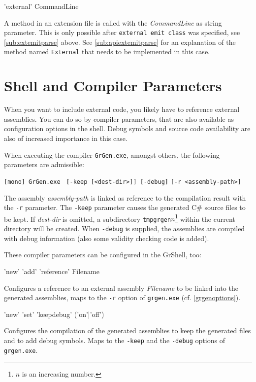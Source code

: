 \begin{rail}
  'external' CommandLine
\end{rail}
A method in an extension file is called with the \emph{CommandLine} as string parameter.
This is only possible after \texttt{external emit class} was specified, see \ref{sub:extemitparse} above.
See \ref{sub:apiextemitparse} for an explanation of the method named \texttt{External} that needs to be implemented in this case.

\pagebreak %

\section{Shell and Compiler Parameters}

When you want to include external code, you likely have to reference external assemblies.
You can do so by compiler parameters, that are also available as configuration options in the shell.
Debug symbols and source code availability are also of increased importance in this case.

When executing the compiler \texttt{GrGen.exe}, amongst others, the following parameters are admissible:

\noindent \texttt{[mono] GrGen.exe } \texttt{[-keep [<dest-dir>]] [-debug]} \texttt{[-r <assembly-path>]}

The assembly \emph{assembly-path} is linked as reference to the compilation result with the \texttt{-r} parameter.
The \texttt{-keep} parameter causes the generated C\# source files to be kept. If \emph{dest-dir} is omitted, a subdirectory \texttt{tmpgrgen$n$}\footnote{$n$ is an increasing number.} within the current directory will be created. 
When \texttt{-debug} is supplied, the assemblies are compiled with debug information (also some validity checking code is added).

These compiler parameters can be configured in the GrShell, too:
\begin{rail}
  'new' 'add' 'reference' Filename
\end{rail}
Configures a reference to an external assembly \emph{Filename} to be linked into the generated assemblies, maps to the \texttt{-r} option of \texttt{grgen.exe} (cf. \ref{grgenoptions}).

\begin{rail}
  'new' 'set' 'keepdebug' ('on'|'off')
\end{rail}
Configures the compilation of the generated assemblies to keep the generated files and to add debug symbols.
Maps to the \texttt{-keep} and the \texttt{-debug} options of \texttt{grgen.exe}.


